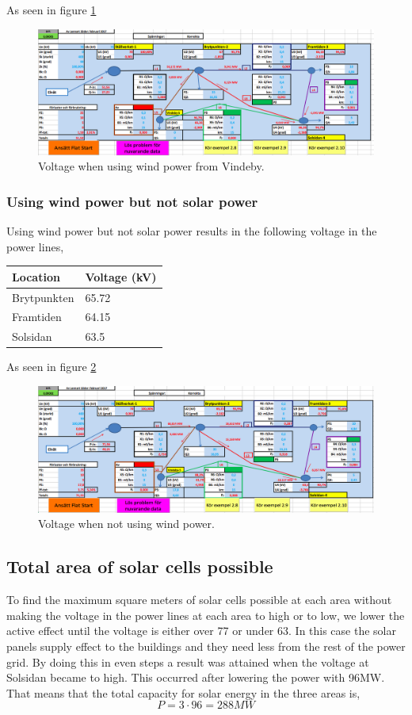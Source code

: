 \documentclass{report}
\newcommand{\case}[1]{\subsubsection*{#1}}
\newcommand{\mysubpart}[1]{\subsection*{#1}}
\begin{document}
As seen in figure \ref{fig_utan_vindeby}
\begin{figure}[h]
\label{fig_utan_vindeby}
\includegraphics[width=\linewidth]{utan_vindeby.png}
\caption{Voltage when using wind power from Vindeby.} 
\end{figure}

\case{Using wind power but not solar power}
Using wind power but not solar power results in the following voltage in the power lines, 

\begin{table}[H] 
\begin{tabular}{ll}
\toprule
Location & Voltage (kV) \\
\midrule
Brytpunkten & 65.72 \\
Framtiden  &  64.15\\
Solsidan & 63.5\\
\bottomrule
\end{tabular} 
\end{table}

As seen in figure \ref{fig_med_vindeby}
\begin{figure}[h]
\label{fig_med_vindeby}
\includegraphics[width=\linewidth]{med_vindeby.png}
\caption{Voltage when not using wind power.} 
\end{figure}

\mysubpart{Total area of solar cells possible }
To find the maximum square meters of solar cells possible at each area without making the voltage in the power lines at each area to high or to low, we lower the active effect until the voltage is either over 77 or under 63. In this case the solar panels supply effect to the buildings and they need less from the rest of the power grid. By doing this in even steps a result was attained when the voltage at Solsidan became to high. This occurred after lowering the power with 96MW. That means that the total capacity for solar energy in the three areas is, 
\begin{equation}
P = 3 \cdot 96 = 288MW
\end{equation}
\end{document}
